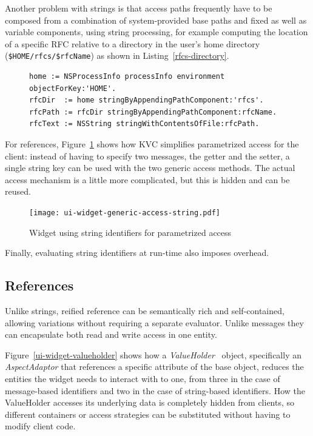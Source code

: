 \documentclass{acm_proc_article-sp}
\begin{document}
Another problem with strings is that access paths frequently have to be composed from a combination of system-provided base paths
and fixed as well as variable components, using string processing, for example computing the location of a specific RFC relative
to a directory in the user's home directory  ({\tt \$HOME/rfcs/\$rfcName}) as shown in Listing~\ref{rfcs-directory}.

\begin{figure}[htbp]
\begin{lstlisting}[style=numbers,label=rfcs-directory,caption=Accessing a specific RFC in a directory relative to the user's \$HOME.]
home := NSProcessInfo processInfo environment objectForKey:'HOME'.
rfcDir  := home stringByAppendingPathComponent:'rfcs'.
rfcPath := rfcDir stringByAppendingPathComponent:rfcName.
rfcText := NSString stringWithContentsOfFile:rfcPath.
\end{lstlisting}
\end{figure}


For references, Figure~\ref{ui-widget-string-access} shows how KVC simplifies parametrized access for 
the client:  instead of having to specify two messages, the getter and the setter, a single string key can be used with
the two generic access methods.  The actual access mechanism is a little more complicated, but this is hidden and can 
be reused.

\begin{figure}[htbp]
\centering
\texttt{[image: ui-widget-generic-access-string.pdf]}
\caption{Widget using string identifiers for parametrized access}
\label{ui-widget-string-access}

\end{figure}

Finally, evaluating string identifiers at run-time also imposes overhead.

\subsection{References}


Unlike strings, reified reference can be semantically rich and self-contained, 
allowing variations without requiring a separate evaluator.
Unlike messages they can encapsulate both read and write access in one entity.  

Figure~\ref{ui-widget-valueholder} shows how a \emph{ValueHolder}~\cite{Woolf:1995:UUV:218662.218699} object,
specifically an {\em AspectAdaptor} that
references a specific attribute of the base object, reduces the entities the widget
needs to interact with to one, from three in the case of message-based identifiers and two
in the case of string-based identifiers.  How the ValueHolder accesses 
its underlying data is completely hidden from clients, so different containers or access
strategies can be substituted without having to modify client code.
\end{document}
